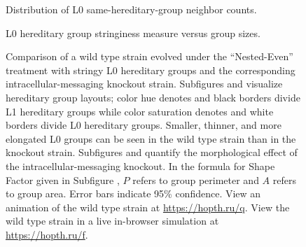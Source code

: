 \begin{figure}[!htbp]
\begin{center}
\begin{minipage}[t]{\linewidth}
\hspace*{\fill}%
\begin{minipage}[t]{0.45\linewidth}
\centering
\vspace{0pt} %
\begin{minipage}[b]{\textwidth}
{ Distribution of L0 same-hereditary-group neighbor counts.}
\end{minipage}
\end{minipage}%
\hspace*{\fill}%
\hspace*{\fill}%
\begin{minipage}[t]{0.45\linewidth}
\centering
\vspace{0pt} %
\begin{minipage}[b]{\textwidth}
{ L0 hereditary group stringiness measure versus group sizes.}
\end{minipage}
\end{minipage}%
\hspace*{\fill}

\end{minipage}

\caption{
Comparison of a wild type strain evolved under the ``Nested-Even'' treatment with stringy L0 hereditary groups and the corresponding intracellular-messaging knockout strain.
Subfigures  and  visualize hereditary group layouts;
color hue denotes and black borders divide L1 hereditary groups while color saturation denotes and white borders divide L0 hereditary groups.
Smaller, thinner, and more elongated L0 groups can be seen in the wild type strain than in the knockout strain.
Subfigures  and  quantify the morphological effect of the intracellular-messaging knockout.
In the formula for Shape Factor given in Subfigure , $P$ refers to group perimeter and $A$ refers to group area.
Error bars indicate 95\% confidence.
View an animation of the wild type strain at \url{https://hopth.ru/q}.
View the wild type strain in a live in-browser simulation at \url{https://hopth.ru/f}.
}
\label{fig:ko-morphology}
\end{center}
\end{figure}

